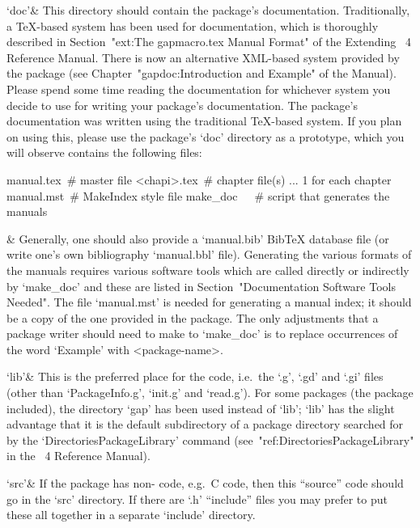 `doc'&
This directory should contain the package's documentation. Traditionally,
a {\TeX}-based system has been used for {\GAP}  documentation,  which  is
thoroughly described in Section~"ext:The gapmacro.tex Manual  Format"  of
the Extending {\GAP}~4 Reference Manual.  There  is  now  an  alternative
XML-based  system  provided  by  the  {\GAP}   package   
(see Chapter~"gapdoc:Introduction and Example"  of  the  
Manual). Please spend some time reading the documentation  for  whichever
system you decide to use for writing your  package's  documentation.  The
{\Example} package's documentation  was  written  using  the  traditional
{\TeX}-based system. If you plan on using this, please use the {\Example}
package's `doc' directory as a prototype, which you will observe contains
the following files:

manual.tex\ \# master file
<chapi>.tex\ \# chapter file(s) ... 1 for each chapter
manual.mst\ \# MakeIndex style file
make_doc\ \ \ \# script that generates the manuals

&
Generally, one should also provide a `manual.bib' Bib{\TeX} database file
(or write one's  own  bibliography  `manual.bbl'  file).  Generating  the
various formats of the manuals requires various software tools which  are
called directly or indirectly by  `make_doc'  and  these  are  listed  in
Section~"Documentation Software Tools Needed". The file  `manual.mst'  is
needed for generating a manual index; it should be  a  copy  of  the  one
provided in the {\Example} package. The only adjustments that  a  package
writer should need to make to `make_doc' is to replace occurrences of the
word `Example' with <package-name>.

`lib'&
This is the preferred place for the {\GAP} code, i.e.~the `.g', `.gd' and
`.gi' files (other than `PackageInfo.g', `init.g' and `read.g'). For some
packages (the {\Example} package included), the directory `gap' has  been
used instead of `lib'; `lib' has the slight  advantage  that  it  is  the
default  subdirectory  of  a  package  directory  searched  for  by   the
`DirectoriesPackageLibrary' command  (see~"ref:DirectoriesPackageLibrary"
in the {\GAP}~4 Reference Manual).

`src'&
If the package has non-{\GAP} code, e.g.~C  code,  then  this  ``source''
code should go in the `src' directory.  If  there  are  `.h'  ``include''
files you may prefer to put these all together in  a  separate  `include'
directory.

